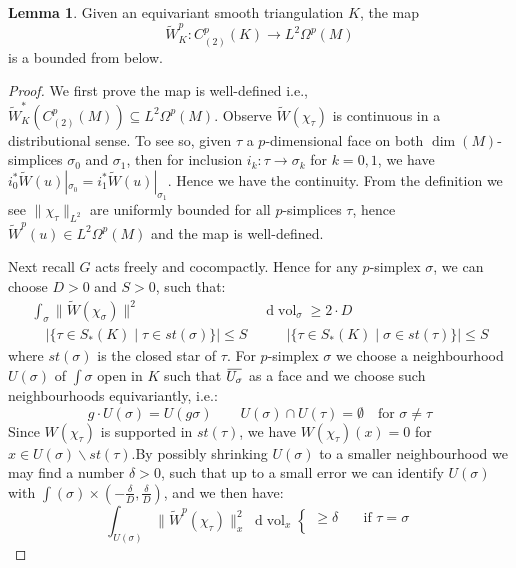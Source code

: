 \documentclass[11pt]{report}
\theoremstyle{definition}
\newtheorem{Lemma}[Def]{Lemma}
\theoremstyle{plain}
\DeclareMathOperator{\vol}{vol}
\newcommand{\overbar}[1]{\mkern 1.5mu\overline{\mkern-1.5mu#1\mkern-1.5mu}\mkern 1.5mu}
\renewcommand{\bar}{\overbar}
\newcommand{\norm}[1]{\lVert #1 \rVert}
\renewcommand{\tilde}{\widetilde}
\newcommand{\mass}[1]{\mathop{}\mathrm{d}{#1}}
\begin{document}
\begin{Lemma}\label{2.79}
Given an equivariant smooth triangulation $K$, the map 
\begin{equation*}
\tilde{W}^p_K:C^p_{(2)}(K)\to L^2\Omega^p(M)
\end{equation*}
is a bounded from below.
\end{Lemma}
\begin{proof}
We first prove the map is well-defined i.e., $\tilde{W}^*_K(C^p_{(2)}(M))\subseteq L^2\Omega^p(M)$. Observe $\tilde{W}(\chi_{\tau})$ is continuous in a distributional sense. To see so, given $\tau$ a $p$-dimensional face on both $\dim(M)$-simplices $\sigma_0$ and $\sigma_1$, then for inclusion $i_k:\tau\to \sigma_k$ for $k=0,1$, we have $i^*_0\tilde{W}(u)|_{\sigma_0}=i^*_1\tilde{W}(u)|_{\sigma_1}$. Hence we have the continuity. From the definition we see $\norm{\chi_{\tau}}_{L^2}$ are uniformly bounded for all $p$-simplices $\tau$, hence $\tilde{W}^p(u)\in L^2\Omega^p(M)$ and the map is well-defined.
 \par Next recall $G$ acts freely and cocompactly. Hence for any $p$-simplex $\sigma$, we can choose $D>0$ and $S>0$, such that:
 \begin{align*}
 \int_{\sigma}^{}\norm{\tilde{W}(\chi_{\sigma})}^2&\mass{\vol_\sigma}\geq 2\cdot D\\
\quad |\{\tau\in S_*(K)\mid \tau\in st(\sigma)\}|\leq S&\qquad  |\{\tau\in S_*(K)\mid \sigma\in st(\tau)\}|\leq S 
 \end{align*}
 where $st(\sigma)$ is the closed star of $\tau$. For $p$-simplex $\sigma$ we choose a neighbourhood $U(\sigma)$ of $\int \sigma$ open in $K$ such that $\bar{U_{\sigma}}$ as a face and we choose such neighbourhoods equivariantly, i.e.:
 \begin{equation*}
  g\cdot U(\sigma)=U(g\sigma) \qquad U(\sigma)\cap U(\tau)=\emptyset \quad \text{for }\sigma\neq \tau
 \end{equation*}
Since $W(\chi_\tau)$ is supported in $st(\tau)$, we have $W(\chi_{\tau})(x)=0$ for $x\in U(\sigma)\backslash st(\tau)$.By possibly shrinking $U(\sigma)$ to a smaller neighbourhood we may find a number $\delta>0$, such that up to a small error we can identify $U(\sigma)$ with $\int(\sigma)\times (-\frac{\delta}{D}, \frac{\delta}{D})$, and we then have:
\begin{equation}\label{110}
\int_{U(\sigma)}\norm{\tilde{W}^p(\chi_\tau)}_x^2\mass{\vol_x}\begin{cases}
\geq \delta \quad &\text{if }\tau=\sigma\\

\end{cases}
\end{equation}
\end{proof}
\end{document}
